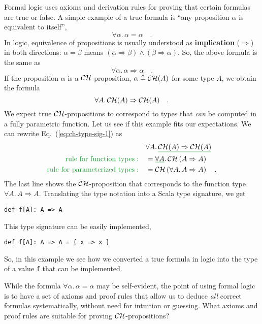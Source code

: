 Formal logic uses axioms and derivation rules for proving that certain
formulas are true or false. A simple example of a true formula is
``any proposition $\alpha$ is equivalent to itself'',
\[
\forall\alpha.\,\alpha=\alpha\quad.
\]
In logic, equivalence of propositions is usually understood as \textbf{implication}
($\Rightarrow$) in both directions: $\alpha=\beta$ means $\left(\alpha\Rightarrow\beta\right)\wedge\left(\beta\Rightarrow\alpha\right)$.
So, the above formula is the same as
\[
\forall\alpha.\,\alpha\Rightarrow\alpha\quad.
\]
If the proposition $\alpha$ is a ${\cal CH}$-proposition, $\alpha\triangleq{\cal CH}(A)$
for some type $A$, we obtain the formula
\begin{equation}
\forall A.\,{\cal CH}(A)\Rightarrow{\cal CH}(A)\quad.\label{eq:ch-type-sig-1}
\end{equation}
We expect true ${\cal CH}$-propositions to correspond to types that
\emph{can} be computed in a fully parametric function. Let us see
if this example fits our expectations. We can rewrite Eq.~(\ref{eq:ch-type-sig-1})
as
\begin{align*}
 & \forall A.\,\gunderline{{\cal CH}(A)\Rightarrow{\cal CH}(A)}\\
{\color{greenunder}\text{rule for function types}:}\quad & =\gunderline{\forall A}.\,{\cal CH}\left(A\Rightarrow A\right)\\
{\color{greenunder}\text{rule for parameterized types}:}\quad & ={\cal CH}\left(\forall A.\,A\Rightarrow A\right)\quad.
\end{align*}
The last line shows the ${\cal CH}$-proposition that corresponds
to the function type $\forall A.\,A\Rightarrow A$. Translating the
type notation into a Scala type signature, we get
\begin{lstlisting}
def f[A]: A => A
\end{lstlisting}
This type signature can be easily implemented,
\begin{lstlisting}
def f[A]: A => A = { x => x }
\end{lstlisting}
So, in this example we see how we converted a true formula in logic
into the type of a value \lstinline!f! that can be implemented.

While the formula $\forall\alpha.\,\alpha=\alpha$ may be self-evident,
the point of using formal logic is to have a set of axioms and proof
rules that allow us to deduce \emph{all} correct formulas systematically,
without need for intuition or guessing. What axioms and proof rules
are suitable for proving ${\cal CH}$-propositions?

